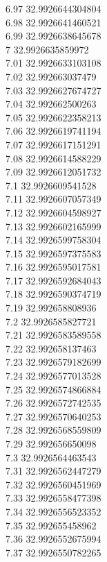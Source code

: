 {6.97	32.9926644304804\\
6.98	32.9926641460521\\
6.99	32.9926638645678\\
7	32.9926635859972\\
7.01	32.9926633103108\\
7.02	32.992663037479\\
7.03	32.9926627674727\\
7.04	32.992662500263\\
7.05	32.9926622358213\\
7.06	32.9926619741194\\
7.07	32.9926617151291\\
7.08	32.9926614588229\\
7.09	32.9926612051732\\
7.1	32.9926609541528\\
7.11	32.9926607057349\\
7.12	32.9926604598927\\
7.13	32.9926602165999\\
7.14	32.9926599758304\\
7.15	32.9926597375583\\
7.16	32.9926595017581\\
7.17	32.9926592684043\\
7.18	32.9926590374719\\
7.19	32.992658808936\\
7.2	32.9926585827721\\
7.21	32.9926583589558\\
7.22	32.992658137463\\
7.23	32.9926579182699\\
7.24	32.9926577013528\\
7.25	32.9926574866884\\
7.26	32.9926572742535\\
7.27	32.9926570640253\\
7.28	32.9926568559809\\
7.29	32.992656650098\\
7.3	32.9926564463543\\
7.31	32.9926562447279\\
7.32	32.9926560451969\\
7.33	32.9926558477398\\
7.34	32.9926556523352\\
7.35	32.992655458962\\
7.36	32.9926552675994\\
7.37	32.9926550782265\\
}
